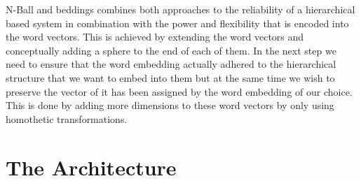 \documentclass[]{article}
\begin{document}
N-Ball and beddings combines both approaches to the reliability of a hierarchical based system in combination with the power and flexibility that is encoded into the word vectors. This is achieved by extending the word vectors and conceptually adding a sphere to the end of each of them. In the next step we need to ensure that the word embedding actually adhered to the hierarchical structure that we want to embed into them but at the same time we wish to preserve the vector of it has been assigned by the word embedding of our choice. This is done by adding more dimensions to these word vectors by only using homothetic transformations.

\section{The Architecture}
\end{document}
